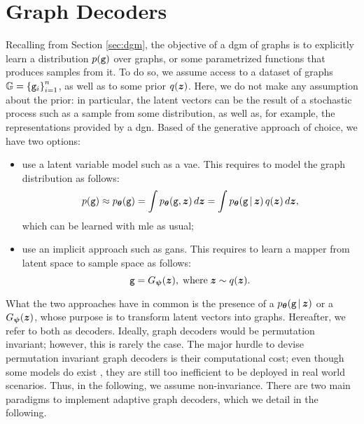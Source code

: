 \section{Graph Decoders}
Recalling from Section \ref{sec:dgm}, the objective of a \gls{dgm} of graphs is to explicitly learn a distribution $p(\mathtt{g})$ over graphs, or some parametrized functions that produces samples from it. To do so, we assume access to a dataset of graphs $\mathbb{G} = \left\{ \mathtt{g}_i \right\}_{i=1}^n$, as well as to some prior $q(\Vector{z})$. Here, we do not make any assumption about the prior: in particular, the latent vectors can be the result of a stochastic process such as a sample from some distribution, as well as, for example, the representations provided by a \gls{dgn}. Based of the generative approach of choice, we have two options:
\begin{itemize}
    \item use a latent variable model such as a \gls{vae}. This requires to model the graph distribution as follows:
    $$p(\Graph{g}) \approx p_{\Param}(\Graph{g}) = \int p_{\Param}(\Graph{g}, \Vector{z})\, d\Vector{z} = \int p_{\Param}(\Graph{g} \given \Vector{z})\, q(\Vector{z})\, d\Vector{z},$$
    which can be learned with \gls{mle} as usual;
    \item use an implicit approach such as \glspl{gan}. This requires to learn a mapper from latent space to sample space as follows:
    $$\Graph{g} = \Generator(\Vector{z}),\; \mathrm{where}\; \Vector{z} \sim q(\Vector{z}).$$
\end{itemize}
What the two approaches have in common is the presence of a  $p_{\Param}(\Graph{g} \given \Vector{z})$ or a  $\Generator(\Vector{z})$, whose purpose is to transform latent vectors into graphs. Hereafter, we refer to both as decoders. Ideally, graph decoders would be permutation invariant; however, this is rarely the case. The major hurdle to devise permutation invariant graph decoders is their computational cost; even though some models do exist \citep{ermon2020scorematching}, they are still too inefficient to be deployed in real world scenarios. Thus, in the following, we assume non-invariance. There are two main paradigms to implement adaptive graph decoders, which we detail in the following.

